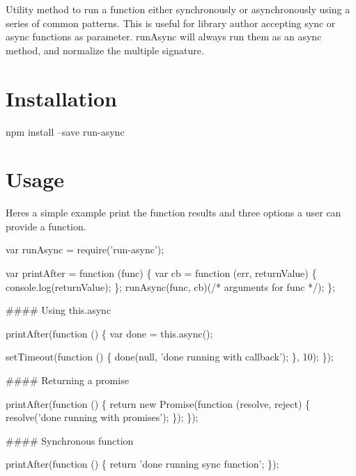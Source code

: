 \href{http://badge.fury.io/js/run-async}{\tt } \href{http://travis-ci.org/SBoudrias/run-async}{\tt } \href{https://david-dm.org/SBoudrias/run-async}{\tt }

Utility method to run a function either synchronously or asynchronously using a series of common patterns. This is useful for library author accepting sync or async functions as parameter. {\ttfamily run\+Async} will always run them as an async method, and normalize the multiple signature.

\section*{Installation }


\begin{DoxyCode}
npm install --save run-async
\end{DoxyCode}


\section*{Usage }

Here\textquotesingle{}s a simple example print the function results and three options a user can provide a function.


\begin{DoxyCode}
var runAsync = require('run-async');

var printAfter = function (func) \{
  var cb = function (err, returnValue) \{
    console.log(returnValue);
  \};
  runAsync(func, cb)(/* arguments for func */);
\};
\end{DoxyCode}


\#\#\#\# Using {\ttfamily this.\+async} 
\begin{DoxyCode}
printAfter(function () \{
  var done = this.async();

  setTimeout(function () \{
    done(null, 'done running with callback');
  \}, 10);
\});
\end{DoxyCode}


\#\#\#\# Returning a promise 
\begin{DoxyCode}
printAfter(function () \{
  return new Promise(function (resolve, reject) \{
    resolve('done running with promises');
  \});
\});
\end{DoxyCode}


\#\#\#\# Synchronous function 
\begin{DoxyCode}
printAfter(function () \{
  return 'done running sync function';
\});
\end{DoxyCode}



